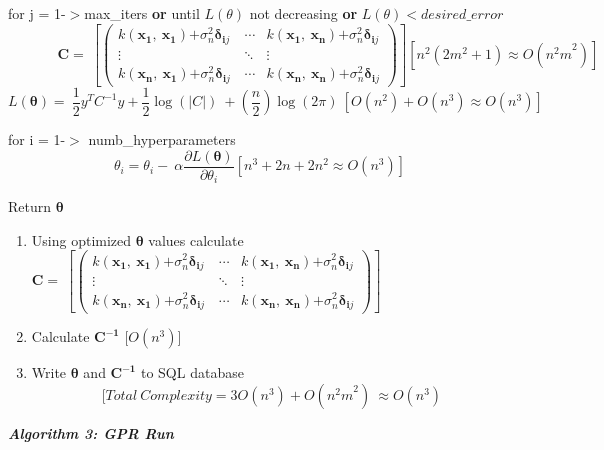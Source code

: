 \documentclass[10.5pt,a4paper,twoside]{report}   %
\begin{document}
\noindent for j = 1-$>$max\_iters \textbf{or} until $L\left(\theta \right)$ not decreasing \textbf{or }$L\left(\theta \right)<desired\_error$
\[\ \ \ \ \ \ \ \ \ \ \ \ \ \ \ \ {\mathbf C}=\ \left[\left( \begin{array}{ccc}
k\left({{\mathbf x}}_{{\mathbf 1}},\ {{\mathbf x}}_{{\mathbf 1}}\right){+\sigma }^2_n{{\mathbf \delta }}_{{\mathbf ij}}\  & \cdots  & k\left({{\mathbf x}}_{{\mathbf 1}},\ {{\mathbf x}}_{{\mathbf n}}\right){+\sigma }^2_n{{\mathbf \delta }}_{{\mathbf ij}} \\ 
\vdots  & \ddots  & \vdots  \\ 
k\left({{\mathbf x}}_{{\mathbf n}},\ {{\mathbf x}}_{{\mathbf 1}}\right){+\sigma }^2_n{{\mathbf \delta }}_{{\mathbf ij}} & \cdots  & k\left({{\mathbf x}}_{{\mathbf n}},\ {{\mathbf x}}_{{\mathbf n}}\right){+\sigma }^2_n{{\mathbf \delta }}_{{\mathbf ij}} \end{array}
\right)\right] [n^2\left(2m^2+1\right)\approx O\left({n^2m}^2\right)]\] 
\[L({\mathbf \theta })=\ \frac{1}{2}y^TC^{-1}y+\frac{1}{2}{\log  \left(\left|C\right|\right)\ }+\left(\frac{n}{2}\right){\log  \left(2\pi \right)\ } [O\left(n^2\right)+O\left(n^3\right)\approx O\left(n^3\right)]\] 


  for i = 1-$>$ numb\_hyperparameters
\[{\theta }_i={\theta }_i-\ \alpha \frac{\partial L\left({\mathbf \theta }\right)}{\partial {\theta }_i} [n^3+2n+2n^2\approx O\left(n^3\right)]\] 

Return ${\mathbf \theta }$\textbf{}

\begin{enumerate}
\item \textbf{ }Using optimized ${\mathbf \theta }$ values calculate ${\mathbf C}=\ \left[\left( \begin{array}{ccc}
k\left({{\mathbf x}}_{{\mathbf 1}},\ {{\mathbf x}}_{{\mathbf 1}}\right){+\sigma }^2_n{{\mathbf \delta }}_{{\mathbf ij}}\  & \cdots  & k\left({{\mathbf x}}_{{\mathbf 1}},\ {{\mathbf x}}_{{\mathbf n}}\right){+\sigma }^2_n{{\mathbf \delta }}_{{\mathbf ij}} \\ 
\vdots  & \ddots  & \vdots  \\ 
k\left({{\mathbf x}}_{{\mathbf n}},\ {{\mathbf x}}_{{\mathbf 1}}\right){+\sigma }^2_n{{\mathbf \delta }}_{{\mathbf ij}} & \cdots  & k\left({{\mathbf x}}_{{\mathbf n}},\ {{\mathbf x}}_{{\mathbf n}}\right){+\sigma }^2_n{{\mathbf \delta }}_{{\mathbf ij}} \end{array}
\right)\right]$ 

\item  Calculate ${{\mathbf C}}^{{\mathbf -}{\mathbf 1}}$\textbf{ }${\mathbf [}O\left(n^3\right)]$

\item  Write ${\mathbf \theta }$ and ${{\mathbf C}}^{{\mathbf -}{\mathbf 1}}$\textbf{ }to SQL database
\[[Total\ Complexity=3O\left(n^3\right)+O\left({n^2m}^2\right)\ \approx O(n^3)\] 
\end{enumerate}
\textbf{\textit{Algorithm 3: GPR Run}}
\end{document}
